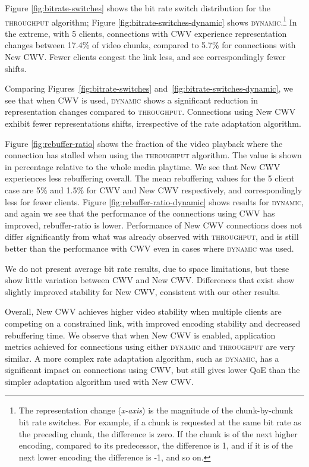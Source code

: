 \documentclass[10pt,sigconf]{acmart}
\begin{document}
Figure \ref{fig:bitrate-switches} shows the bit rate switch distribution for the \textsc{throughput} algorithm; Figure \ref{fig:bitrate-switches-dynamic} shows \textsc{dynamic}.\footnote{The representation change (\emph{x-axis}) is the magnitude of the chunk-by-chunk bit rate switches. For example, if a chunk is requested at the same bit rate as the preceding chunk, the difference is zero. If the chunk is of the next higher encoding, compared to its predecessor, the difference is 1, and if it is of the next lower encoding the difference is -1, and so on.} 
In the extreme, with 5 clients, connections with CWV experience representation changes between 17.4\% of video chunks, compared to 5.7\% for connections with New CWV. Fewer clients congest the link less, and see correspondingly fewer shifts.

Comparing Figures~\ref{fig:bitrate-switches} and~\ref{fig:bitrate-switches-dynamic}, we see that when CWV is used, \textsc{dynamic} shows a significant reduction in representation changes compared to \textsc{throughput}. Connections using New CWV exhibit fewer representations shifts, irrespective of the rate adaptation algorithm.


Figure \ref{fig:rebuffer-ratio} shows the fraction of the video playback where the connection has stalled when using the \textsc{throughput} algorithm. The value is shown in percentage relative to the whole media playtime. We see that New CWV experiences less rebuffering overall. The mean rebuffering values for the 5 client case are 5\% and 1.5\% for CWV and New CWV respectively, and correspondingly less for fewer clients. 
Figure \ref{fig:rebuffer-ratio-dynamic} shows results for \textsc{dynamic}, and again we see that the performance of the connections using CWV has improved, rebuffer-ratio is lower. Performance of New CWV connections does not differ significantly from what was already observed with \textsc{throughput}, and is still better than the performance with CWV even in cases where \textsc{dynamic} was used.

We do not present average bit rate results, due to space limitations, but these show little variation between CWV and New CWV. Differences that exist show slightly improved stability for New CWV, consistent with our other results.


Overall, New CWV achieves higher video stability when multiple clients are competing on a constrained link, with improved encoding stability and decreased rebuffering time. 
We observe that when New CWV is enabled, application metrics achieved for connections using either \textsc{dynamic} and \textsc{throughput} are very similar. A more complex rate adaptation algorithm, such as \textsc{dynamic}, has a significant impact on connections using CWV, but still gives lower QoE than the simpler adaptation algorithm used with New CWV.
\end{document}
